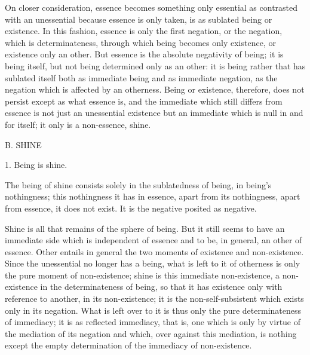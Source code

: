 On closer consideration, essence becomes something
only essential as contrasted with an unessential
because essence is only taken,
is as sublated being or existence.
In this fashion, essence is only the first negation,
or the negation, which is determinateness,
through which being becomes only existence,
or existence only an other.
But essence is the absolute negativity of being;
it is being itself, but not being determined only as an other:
it is being rather that has sublated itself
both as immediate being
and as immediate negation,
as the negation which is affected by an otherness.
Being or existence, therefore, does not persist
except as what essence is,
and the immediate which still differs from essence is not just
an unessential existence but an immediate
which is null in and for itself;
it only is a non-essence, shine.

B. SHINE

1. Being is shine.

The being of shine consists solely
in the sublatedness of being,
in being's nothingness;
this nothingness it has in essence,
apart from its nothingness,
apart from essence, it does not exist.
It is the negative posited as negative.

Shine is all that remains of the sphere of being.
But it still seems to have an immediate side
which is independent of essence and to be, in general,
an other of essence.
Other entails in general the two moments of existence and non-existence.
Since the unessential no longer has a being,
what is left to it of otherness is only the pure moment of non-existence;
shine is this immediate non-existence,
a non-existence in the determinateness of being,
so that it has existence only with reference to another,
in its non-existence;
it is the non-self-subsistent which exists only in its negation.
What is left over to it is thus only
the pure determinateness of immediacy;
it is as reflected immediacy, that is, one which is
only by virtue of the mediation of its negation
and which, over against this mediation, is nothing
except the empty determination of the immediacy of non-existence.

